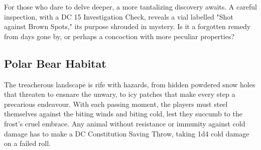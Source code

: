 For those who dare to delve deeper, a more tantalizing discovery awaits. A careful inspection, with a DC 15 Investigation Check, reveals a vial labelled "Shot against Brown Spots," its purpose shrouded in mystery. Is it a forgotten remedy from days gone by, or perhaps a concoction with more peculiar properties?
\subsection*{ Polar Bear Habitat}
The treacherous landscape is rife with hazards, from hidden powdered snow holes that threaten to ensnare the unwary, to icy patches that make every step a precarious endeavour. With each passing moment, the players must steel themselves against the biting winds and biting cold, lest they succumb to the frost's cruel embrace. Any animal without resistance or immunity against cold damage has to make a DC Constitution Saving Throw, taking 1d4 cold damage on a failed roll.

